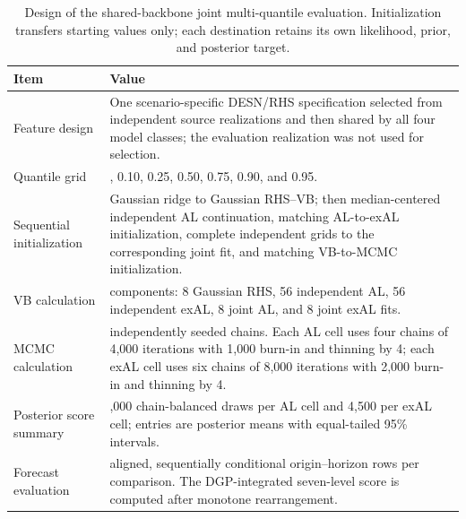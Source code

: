 \begin{table}[!htbp]
\centering
\small
\begin{tabular}{@{}>{\raggedright\arraybackslash}p{}>{\raggedright\arraybackslash}p{}@{}}
\toprule
Item & Value \\
\midrule
Feature design & One scenario-specific DESN/RHS specification selected from independent source realizations and then shared by all four model classes; the evaluation realization was not used for selection. \\
Quantile grid & 0.05, 0.10, 0.25, 0.50, 0.75, 0.90, and 0.95. \\
Sequential initialization & Gaussian ridge to Gaussian RHS--VB; then median-centered independent AL continuation, matching AL-to-exAL initialization, complete independent grids to the corresponding joint fit, and matching VB-to-MCMC initialization. \\
VB calculation & 136 components: 8 Gaussian RHS, 56 independent AL, 56 independent exAL, 8 joint AL, and 8 joint exAL fits. \\
MCMC calculation & 160 independently seeded chains. Each AL cell uses four chains of 4,000 iterations with 1,000 burn-in and thinning by 4; each exAL cell uses six chains of 8,000 iterations with 2,000 burn-in and thinning by 4. \\
Posterior score summary & 3,000 chain-balanced draws per AL cell and 4,500 per exAL cell; entries are posterior means with equal-tailed 95\% intervals. \\
Forecast evaluation & 990 aligned, sequentially conditional origin--horizon rows per comparison. The DGP-integrated seven-level score is computed after monotone rearrangement. \\
\bottomrule
\end{tabular}
\caption{Design of the shared-backbone joint multi-quantile evaluation. Initialization transfers starting values only; each destination retains its own likelihood, prior, and posterior target.}
\label{tab:joint-qdesn-shared-backbone-protocol}
\end{table}
